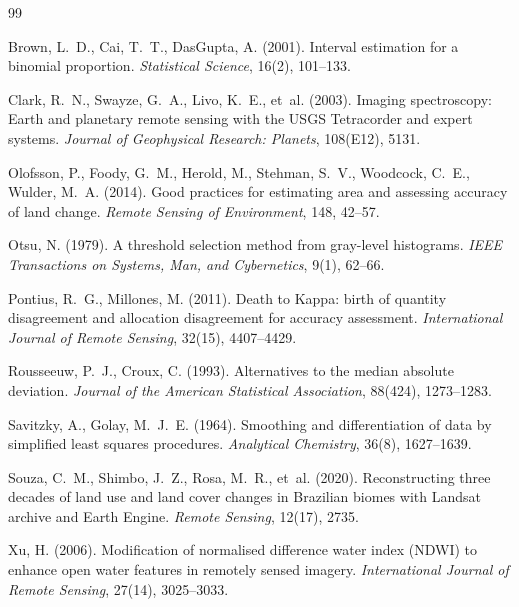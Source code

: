 \documentclass[11pt,a4paper]{article}
\begin{document}
\begin{thebibliography}{99}
\small

Brown, L.~D., Cai, T.~T., DasGupta, A. (2001). Interval estimation for a
binomial proportion. \textit{Statistical Science}, 16(2), 101--133.

Clark, R.~N., Swayze, G.~A., Livo, K.~E., et~al. (2003). Imaging spectroscopy:
Earth and planetary remote sensing with the USGS Tetracorder and expert
systems. \textit{Journal of Geophysical Research: Planets}, 108(E12), 5131.

Olofsson, P., Foody, G.~M., Herold, M., Stehman, S.~V., Woodcock, C.~E.,
Wulder, M.~A. (2014). Good practices for estimating area and assessing
accuracy of land change. \textit{Remote Sensing of Environment}, 148, 42--57.

Otsu, N. (1979). A threshold selection method from gray-level histograms.
\textit{IEEE Transactions on Systems, Man, and Cybernetics}, 9(1), 62--66.

Pontius, R.~G., Millones, M. (2011). Death to Kappa: birth of quantity
disagreement and allocation disagreement for accuracy assessment.
\textit{International Journal of Remote Sensing}, 32(15), 4407--4429.

Rousseeuw, P.~J., Croux, C. (1993). Alternatives to the median absolute
deviation. \textit{Journal of the American Statistical Association}, 88(424),
1273--1283.

Savitzky, A., Golay, M.~J.~E. (1964). Smoothing and differentiation of data by
simplified least squares procedures. \textit{Analytical Chemistry}, 36(8),
1627--1639.

Souza, C.~M., Shimbo, J.~Z., Rosa, M.~R., et~al. (2020). Reconstructing three
decades of land use and land cover changes in Brazilian biomes with Landsat
archive and Earth Engine. \textit{Remote Sensing}, 12(17), 2735.

Xu, H. (2006). Modification of normalised difference water index (NDWI) to
enhance open water features in remotely sensed imagery.
\textit{International Journal of Remote Sensing}, 27(14), 3025--3033.

\end{thebibliography}


\begin{historico}
\end{historico}

            {}{}
\end{document}
